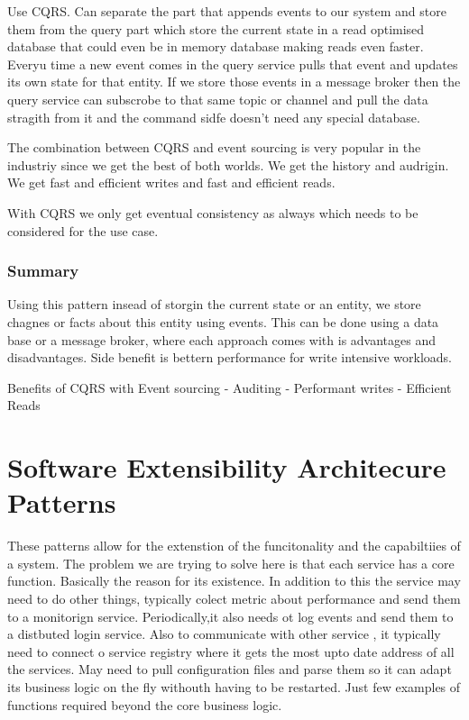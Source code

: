 \documentclass[a4paper, 11pt]{book}
\begin{document}
    Use CQRS.
    Can separate the part that appends events to our system and store them from the query part which store the current state in a read optimised database that could even be in memory database making reads even faster.
    Everyu time a new event comes in the query service pulls that event and updates its own state for that entity.
    If we store those events in a message broker then the query service can subscrobe to that same topic or channel and pull the data stragith from it and the command sidfe doesn't need any special database.

    The combination between CQRS and event sourcing is very popular in the industriy since we get the best of both worlds.
    We get the history and audrigin.
    We get fast and efficient writes and fast and efficient reads.

    With CQRS we only get eventual consistency as always which needs to be considered for the use case.

    \subsubsection{Summary}
    Using this pattern insead of storgin the current state or an entity, we store chagnes or facts about this entity using events.
    This can be done using a data base or a message broker, where each approach comes with is advantages and disadvantages.
    Side benefit is bettern performance for write intensive workloads.

    Benefits of CQRS with Event sourcing
    - Auditing
    - Performant writes
    - Efficient Reads


    \section{Software Extensibility Architecure Patterns}

    These patterns allow for the extenstion of the funcitonality and the capabiltiies of a system.
    The problem we are trying to solve here is that each service has a core function.
    Basically the reason for its existence.
    In addition to this the service may need to do other things, typically colect metric about performance and send them to a monitorign service.
    Periodically,it also needs ot log events and send them to a distbuted login service.
    Also to communicate with other service , it typically need to connect o service registry where it gets the most upto date address of all the services.
    May need to pull configuration files and parse them so it can adapt its business logic on the fly withouth having to be restarted.
    Just few examples of functions required beyond the core business logic.
\end{document}
